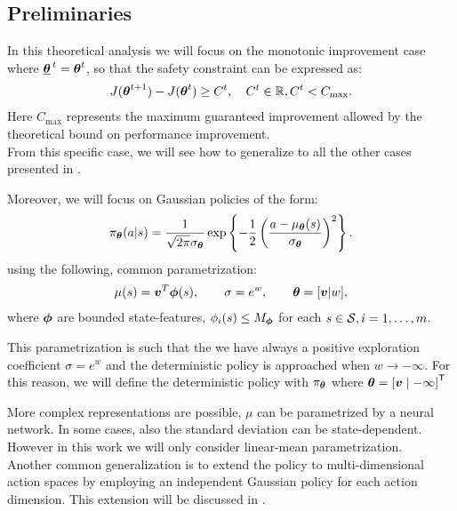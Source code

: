 \subsection{Preliminaries}

In this theoretical analysis we will focus on the monotonic improvement case where ${\underline{{\boldsymbol{\theta}}}^{\,t}}={\boldsymbol{\theta}}^t$, so that the safety constraint can be expressed as:
%
\begin{align*}
J({\boldsymbol{\theta}}^{t+1}) - J({\boldsymbol{\theta}}^t) \geq C^t, \quad C^t \in \mathbb{R}, C^t < C_{\text{max}}.
\end{align*}
Here $C_\text{max}$ represents the maximum guaranteed improvement allowed by the theoretical bound on performance improvement. \\
From this specific case, we will see how to generalize to all the other cases presented in .


Moreover, we will focus on Gaussian policies of the form:
\[
	\pi_{{\boldsymbol{\theta}}}(a\vert s) = \frac{1}{\sqrt{2\pi}\sigma_{{\boldsymbol{\theta}}}}\exp\left\{-\frac{1}{2}\left(\frac{a - \mu_{{\boldsymbol{\theta}}}(s)}{\sigma_{{\boldsymbol{\theta}}}}\right)^2\right\}.
\]
using the following, common parametrization:
\begin{align}\label{eq:parametrization}
\mu(s)=\boldsymbol{v}^T\boldsymbol{\phi}(s), \qquad \sigma=e^w, \qquad {\boldsymbol{\theta}}=[\boldsymbol{v}\vert w],
\end{align}
where $\boldsymbol{\phi}$ are bounded state-features, \ie $\phi_i(s) \leq M_{\boldsymbol{\phi}}$ for each $s\in\mathcal{S}, i=1,\dots,m$.
\begin{note}
This parametrization is such that the we have always a positive exploration coefficient $\sigma=e^w$ and the deterministic policy is approached when $w \rightarrow -\infty$. For this reason, we will define the deterministic policy with $\pi_{{\boldsymbol{\theta}}}$ where ${\boldsymbol{\theta}} = {[\boldsymbol{v} \mid -\infty]}^{\mathsf{T}}$
\end{note}

More complex representations are possible, \eg $\mu$ can be parametrized by a neural network. In some cases, also the standard deviation can be state-dependent. However in this work we will only consider linear-mean parametrization. \\
Another common generalization is to extend the policy to multi-dimensional action spaces by employing an independent Gaussian policy for each action dimension. This extension will be discussed in .

